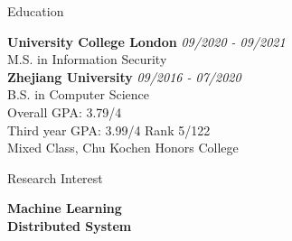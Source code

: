 \documentclass{resume}
\begin{document}

\begin{rSection}{Education}

{\bf University College London} \hfill {\em 09/2020 - 09/2021} \\ 
M.S. in Information Security \\

{\bf Zhejiang University} \hfill {\em 09/2016 - 07/2020} \\ 
B.S. in Computer Science \\
Overall GPA: 3.79/4 \\
Third year GPA: 3.99/4 Rank 5/122 \\
Mixed Class, Chu Kochen Honors College

\end{rSection}


\begin{rSection}{Research Interest}

{\bf Machine Learning}\\ {\bf Distributed System}

\end{rSection}

\end{document}
